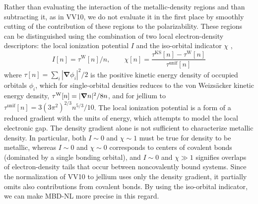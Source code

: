 Rather than evaluating the interaction of the metallic-density regions and than subtracting it, as in VV10, we do not evaluate it in the first place by smoothly cutting of the contribution of these regions to the polarizability.
These regions can be distinguished using the combination of two local electron-density descriptors: the local ionization potential $I$ \citep{GutleIJQC99} and the iso-orbital indicator $\chi$ \citep{BeckeJCP90,KummelMP03,SunPRL13},
\begin{equation}
  I[n]=\tau^\text{W}[n]/n,\qquad
  \chi[n]=\frac{\tau^\text{KS}[n]-\tau^\text{W}[n]}{\tau^\text{unif}[n]}
\end{equation}
where $\tau[n]=\sum_i|\boldsymbol\nabla\phi_i|^2/2$ is the positive kinetic energy density of occupied orbitals $\phi_i$, which for single-orbital densities reduces to the von Weizsäcker kinetic energy density, $\tau^\text W[n]=|\boldsymbol\nabla n|^2/8n$, and for jellium to $\tau^\mathrm{unif}[n]=3(3\pi^2)^{2/3}n^{5/3}/10$.  %
The local ionization potential is a form of a reduced gradient with the units of energy, which attempts to model the local electronic gap.
The density gradient alone is not sufficient to characterize metallic density.
In particular, both $I\sim0$ and $\chi\sim1$ must be true for density to be metallic, whereas $I\sim0$ and $\chi\sim0$ corresponds to centers of covalent bonds (dominated by a single bonding orbital), and $I\sim0$ and $\chi\gg1$ signifies overlaps of electron-density tails that occur between noncovalently bound systems.
Since the normalization of VV10 to jellium uses only the density gradient, it partially omits also contributions from covalent bonds.
By using the iso-orbital indicator, we can make MBD-NL more precise in this regard.

